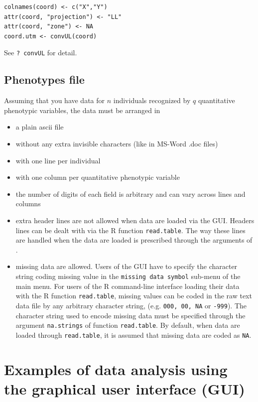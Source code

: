 \documentclass[a4paper,10pt]{article}
\begin{document}
\begin{verbatim}
colnames(coord) <- c("X","Y")
attr(coord, "projection") <- "LL"
attr(coord, "zone") <- NA 
coord.utm <- convUL(coord)
\end{verbatim}

See {\tt ? convUL} for detail.


\subsection{Phenotypes file}


Assuming that you have data for $n$  individuals recognized by $q$ quantitative 
phenotypic variables, the data must be arranged in 
\begin{itemize}
\item a plain ascii file 
\item without any extra invisible characters (like in MS-Word .doc files)
\item with one line per individual
\item with one column per  quantitative phenotypic variable
\item the number of digits of each field is arbitrary and can vary across lines and columns
\item extra header lines are not allowed when data are loaded via the GUI. 
Headers lines can be dealt with via the R function \texttt{read.table}. 
 The way these lines are handled when the data are loaded is prescribed 
through the arguments of .
\item missing data  are allowed. 
Users of the GUI have to specify the character string coding missing value in the \texttt{missing data symbol} sub-menu 
of the main menu. 
For users of the R command-line interface loading their data with the R function \texttt{read.table}, 
missing values can be coded in the raw text data file by any arbitrary character string, 
(e.g. {\tt000, 00, NA} or {\tt -999}). 
The character string used to encode missing data must be specified through the argument \texttt{na.strings} 
of function \texttt{read.table}. By default, when data are loaded through \texttt{read.table}, 
it is assumed that missing data 
are coded as {\tt NA}.
\end{itemize}


\clearpage
\section[Examples with the GUI]{Examples of data analysis using the graphical user interface (GUI)}
\end{document}
